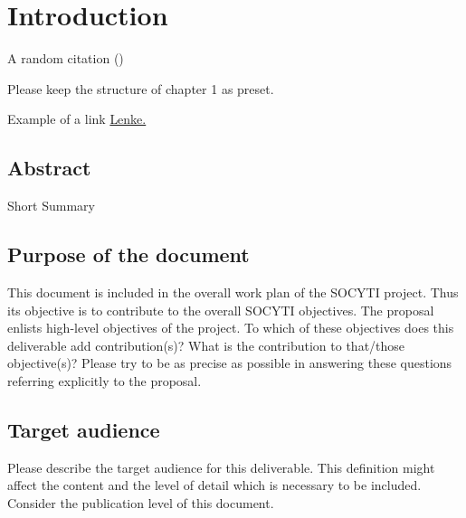 \section{Introduction}
A random citation (\cite{lowry1951protein})

Please keep the structure of chapter 1 as preset. 

Example of a link \href{http://www.vestforsk.no}{Lenke.}

\subsection{Abstract}

Short Summary

\subsection{Purpose of the document}

This document is included in the overall work plan of the SOCYTI project. Thus its objective is to contribute to the overall SOCYTI objectives. The proposal enlists high-level objectives of the project. To which of these objectives does this deliverable add contribution(s)? What is the contribution to that/those objective(s)? Please try to be as precise as possible in answering these questions referring explicitly to the proposal.

\subsection{Target audience}

Please describe the target audience for this deliverable. This definition might affect the content and the level of detail which is necessary to be included. Consider the publication level of this document. 